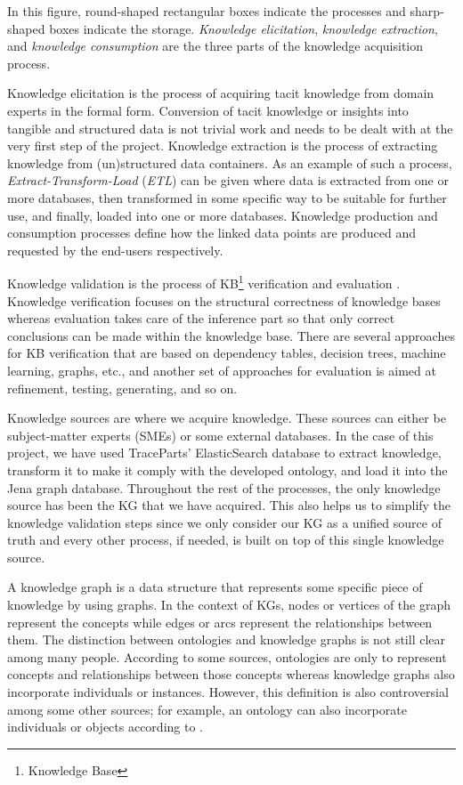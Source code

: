 In this figure, round-shaped rectangular boxes indicate the processes and sharp-shaped boxes indicate 
the storage. \textit{Knowledge elicitation}, \textit{knowledge extraction}, and \textit{knowledge 
consumption} are the three parts of the knowledge acquisition process.

Knowledge elicitation is the process of acquiring tacit knowledge from domain experts in the formal 
form. Conversion of tacit knowledge or insights into tangible and structured data is not trivial 
work and needs to be dealt with at the very first step of the project. 
Knowledge extraction is the process of extracting knowledge from (un)structured data containers. As 
an example of such a process, \textit{Extract-Transform-Load} (\textit{ETL}) can be given where data 
is extracted from one or more databases, then transformed in some specific way to be suitable for 
further use, and finally, loaded into one or more databases.
Knowledge production and consumption processes define how the linked data points are produced and 
requested by the end-users respectively. 

Knowledge validation is the process of KB\footnote{Knowledge Base} verification and 
evaluation \cite{LAUR,Owoc1999}. Knowledge verification focuses on the structural correctness of 
knowledge bases whereas evaluation takes care of the inference part so that only correct conclusions 
can be made within the knowledge base. There are several approaches for KB verification that are 
based on dependency tables, decision trees, machine learning, graphs, etc., and another set of 
approaches for evaluation is aimed at refinement, testing, generating, and so on.

Knowledge sources are where we acquire knowledge. These sources can either be subject-matter 
experts (SMEs) or some external databases. In the case of this project, we have used TraceParts' 
ElasticSearch database to extract knowledge, transform it to make it comply with the developed 
ontology, and load it into the Jena graph database. Throughout the rest of the processes, the only 
knowledge source has been the KG that we have acquired. This also helps us to simplify the 
knowledge validation steps since we only consider our KG as a unified source of truth and every other 
process, if needed, is built on top of this single knowledge source.

A knowledge graph is a data structure that represents some specific piece of knowledge by using 
graphs. In the context of KGs, nodes or vertices of the graph represent the concepts while edges or 
arcs represent the relationships between them. The distinction between ontologies and knowledge graphs 
is not still clear among many people. According to some sources, ontologies are only to represent 
concepts 
and relationships between those concepts whereas knowledge graphs also incorporate individuals or 
instances. However, this definition is also controversial among some other sources; for example, 
an ontology can also incorporate individuals or objects according to \cite{enwiki:1085831526}.

